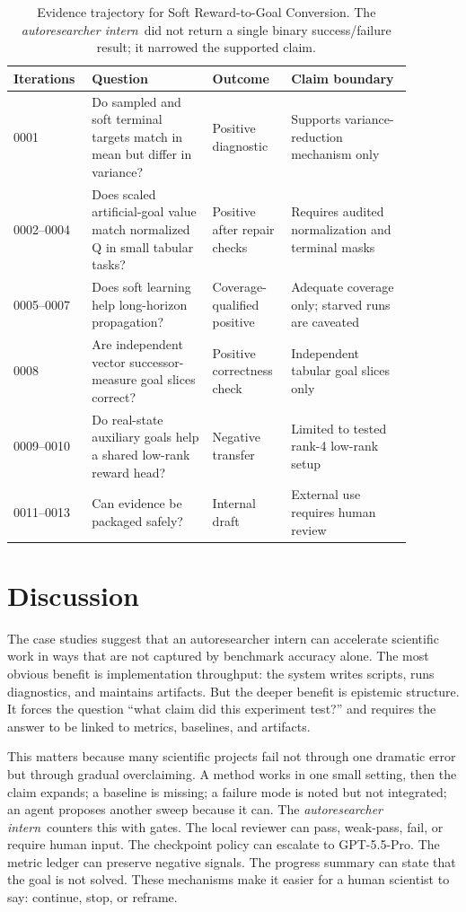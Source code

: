 \documentclass{article}
\newcommand{\intern}{\emph{autoresearcher intern}}
\newcommand{\gptpro}{GPT-5.5-Pro}
\begin{document}
\begin{table}[t]
\centering
\small
\begin{tabular}{p{0.14\linewidth}p{0.28\linewidth}p{0.18\linewidth}p{0.28\linewidth}}
\toprule
Iterations & Question & Outcome & Claim boundary \\
\midrule
0001 & Do sampled and soft terminal targets match in mean but differ in variance? & Positive diagnostic & Supports variance-reduction mechanism only \\
0002--0004 & Does scaled artificial-goal value match normalized Q in small tabular tasks? & Positive after repair checks & Requires audited normalization and terminal masks \\
0005--0007 & Does soft learning help long-horizon propagation? & Coverage-qualified positive & Adequate coverage only; starved runs are caveated \\
0008 & Are independent vector successor-measure goal slices correct? & Positive correctness check & Independent tabular goal slices only \\
0009--0010 & Do real-state auxiliary goals help a shared low-rank reward head? & Negative transfer & Limited to tested rank-4 low-rank setup \\
0011--0013 & Can evidence be packaged safely? & Internal draft & External use requires human review \\
\bottomrule
\end{tabular}
\caption{Evidence trajectory for Soft Reward-to-Goal Conversion. The \intern\ did not return a single binary success/failure result; it narrowed the supported claim.}
\label{tab:rewardtrajectory}
\end{table}

\section{Discussion}

The case studies suggest that an autoresearcher intern can accelerate scientific work in ways that are not captured by benchmark accuracy alone. The most obvious benefit is implementation throughput: the system writes scripts, runs diagnostics, and maintains artifacts. But the deeper benefit is epistemic structure. It forces the question ``what claim did this experiment test?'' and requires the answer to be linked to metrics, baselines, and artifacts.

This matters because many scientific projects fail not through one dramatic error but through gradual overclaiming. A method works in one small setting, then the claim expands; a baseline is missing; a failure mode is noted but not integrated; an agent proposes another sweep because it can. The \intern\ counters this with gates. The local reviewer can pass, weak-pass, fail, or require human input. The checkpoint policy can escalate to \gptpro. The metric ledger can preserve negative signals. The progress summary can state that the goal is not solved. These mechanisms make it easier for a human scientist to say: continue, stop, or reframe.
\end{document}
